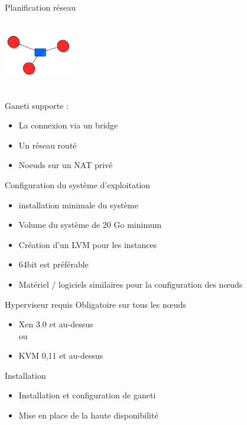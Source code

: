 \begin{frame}{Planification réseau}
\begin{center}
  \includegraphics[width=3cm,height=3cm]{images_presentation/network.png}
\end{center}
\begin{block}{Ganeti supporte :}
\begin{itemize}
\item La connexion via un bridge
\pause
\item Un réseau routé
\pause
\item Noeuds sur un NAT privé
\end{itemize}
\end{block}
\end{frame}

\begin{frame}{Configuration du système d'exploitation}
\begin{itemize}
\item installation minimale du système
\pause
\item Volume du système de 20 Go minimum
\pause
\item Création d'un LVM pour les instances
\pause
\item 64bit est préférable
\pause
\item Matériel / logiciels similaires pour la configuration des nœuds
\end{itemize}
\end{frame}

\begin{frame}{Hyperviseur requis}
Obligatoire sur tous les nœuds
\begin{itemize}
\item Xen 3.0 et au-dessus \\ou
\pause
\item KVM 0,11 et au-dessus
\end{itemize}
\end{frame}

\begin{frame}{Installation}
\begin{itemize}
\item Installation et configuration de ganeti
\pause
\item Mise en place de la haute disponibilité
\end{itemize}
\end{frame}

